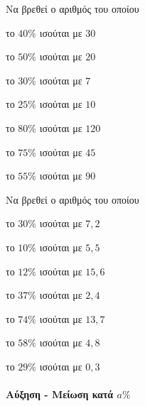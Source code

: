 \documentclass[11pt,a4paper,modern]{FFExercises}
\begin{document}
\askhsh Να βρεθεί ο αριθμός του οποίου
\begin{multicols}{2}
\begin{alist}[leftmargin=5mm]
\item το $40\%$ ισούται με $30$
\item το $50\%$ ισούται με $20$
\item το $30\%$ ισούται με $7$
\item το $25\%$ ισούται με $10$
\item το $80\%$ ισούται με $120$
\item το $75\%$ ισούται με $45$
\item το $55\%$ ισούται με $90$
\end{alist}
\end{multicols}
\askhsh Να βρεθεί ο αριθμός του οποίου
\begin{multicols}{2}
\begin{alist}[leftmargin=5mm]
\item το $30\%$ ισούται με $7{,}2$
\item το $10\%$ ισούται με $5{,}5$
\item το $12\%$ ισούται με $15{,}6$
\item το $37\%$ ισούται με $2{,}4$
\item το $74\%$ ισούται με $13{,}7$
\item το $58\%$ ισούται με $4{,}8$
\item το $29\%$ ισούται με $0{,}3$
\end{alist}
\end{multicols}
\paragraph{Αύξηση - Μείωση κατά $a\%$}
\askhsh 
\end{document}
